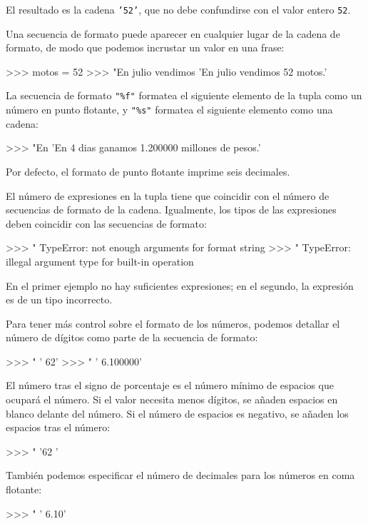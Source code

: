 El resultado es la cadena \texttt{'52'}, que no debe confundirse con
el valor entero \texttt{52}.

Una secuencia de formato puede aparecer en cualquier lugar de la cadena
de formato, de modo que podemos incrustar un valor en una frase:
\begin{pyconcode}
>>> motos = 52
>>> "En julio vendimos %
'En julio vendimos 52 motos.'
\end{pyconcode}

La secuencia de formato {\verb+"%f"+} formatea el siguiente elemento
de la tupla como un número en punto flotante, y {\verb+"%s"+} formatea
el siguiente elemento como una cadena:
\begin{pyconcode}
>>> "En %
'En 4 dias ganamos 1.200000 millones de pesos.'
\end{pyconcode}

Por defecto, el formato de punto flotante imprime seis decimales.

El número de expresiones en la tupla tiene que coincidir con el número
de secuencias de formato de la cadena. Igualmente, los tipos de las
expresiones deben coincidir con las secuencias de formato:

\begin{pyconcode}
>>> "%
TypeError: not enough arguments for format string
>>> "%
TypeError: illegal argument type for built-in operation
\end{pyconcode}

En el primer ejemplo no hay suficientes expresiones; en el segundo,
la expresión es de un tipo incorrecto.

Para tener más control sobre el formato de los números, podemos detallar
el número de dígitos como parte de la secuencia de formato:
\begin{pyconcode}
>>> "%
'    62'
>>> "%
'    6.100000'
\end{pyconcode}

El número tras el signo de porcentaje es el número mínimo de espacios
que ocupará el número. Si el valor necesita menos dígitos, se añaden
espacios en blanco delante del número. Si el número de espacios es
negativo, se añaden los espacios tras el número:
\begin{pyconcode}
>>> "%
'62    '
\end{pyconcode}

También podemos especificar el número de decimales para los números
en coma flotante:
\begin{pyconcode}
>>> "%
'        6.10'
\end{pyconcode}

